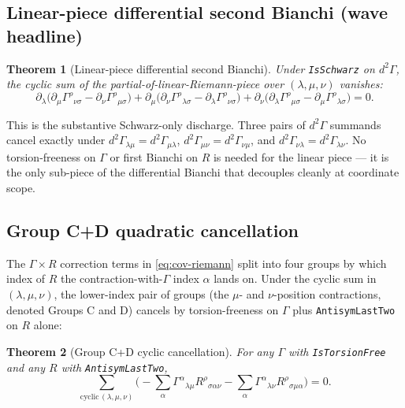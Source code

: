 \documentclass[twocolumn]{revtex4-2}
\newtheorem{theorem}{Theorem}
\newcommand{\Christoffel}{\Gamma}
\begin{document}
\subsection{Linear-piece differential second Bianchi (wave headline)}
\label{sec:linear-diffbianchi}

\begin{theorem}[Linear-piece differential second Bianchi]
\label{thm:linear-diff-bianchi}
Under \texttt{IsSchwarz} on $d^{2}\Christoffel$, the cyclic sum of
the partial-of-linear-Riemann-piece over $(\lambda,\mu,\nu)$ vanishes:
\begin{equation}
\partial_{\lambda} \big(\partial_{\mu} \Christoffel^{\rho}{}_{\nu\sigma}
                       - \partial_{\nu} \Christoffel^{\rho}{}_{\mu\sigma}\big)
+ \partial_{\mu} \big(\partial_{\nu} \Christoffel^{\rho}{}_{\lambda\sigma}
                       - \partial_{\lambda} \Christoffel^{\rho}{}_{\nu\sigma}\big)
+ \partial_{\nu} \big(\partial_{\lambda} \Christoffel^{\rho}{}_{\mu\sigma}
                       - \partial_{\mu} \Christoffel^{\rho}{}_{\lambda\sigma}\big)
= 0.
\label{eq:linear-diff-bianchi}
\end{equation}
\end{theorem}

This is the substantive Schwarz-only discharge. Three pairs of
$d^{2}\Christoffel$ summands cancel exactly under
$d^{2}\Christoffel_{\lambda\mu} = d^{2}\Christoffel_{\mu\lambda}$,
$d^{2}\Christoffel_{\mu\nu} = d^{2}\Christoffel_{\nu\mu}$, and
$d^{2}\Christoffel_{\nu\lambda} = d^{2}\Christoffel_{\lambda\nu}$. No
torsion-freeness on $\Christoffel$ or first Bianchi on $R$ is
needed for the linear piece — it is the only sub-piece of the
differential Bianchi that decouples cleanly at coordinate scope.

\subsection{Group C+D quadratic cancellation}
\label{sec:groupcd}
The $\Christoffel \times R$ correction terms in
\eqref{eq:cov-riemann} split into four groups by which index of $R$
the contraction-with-$\Christoffel$ index $\alpha$ lands on. Under
the cyclic sum in $(\lambda, \mu, \nu)$, the lower-index pair of
groups (the $\mu$- and $\nu$-position contractions, denoted Groups C
and D) cancels by torsion-freeness on $\Christoffel$ plus
\texttt{AntisymLastTwo} on $R$ alone:

\begin{theorem}[Group C+D cyclic cancellation]
\label{thm:group-cd}
For any $\Christoffel$ with \texttt{IsTorsionFree} and any $R$ with
\texttt{AntisymLastTwo},
\begin{equation}
\sum_{\mathrm{cyclic}\,(\lambda,\mu,\nu)}
  \Big(- \sum_{\alpha} \Christoffel^{\alpha}{}_{\lambda\mu}
        R^{\rho}{}_{\sigma\alpha\nu}
       - \sum_{\alpha} \Christoffel^{\alpha}{}_{\lambda\nu}
        R^{\rho}{}_{\sigma\mu\alpha}\Big) = 0.
\label{eq:group-cd}
\end{equation}
\end{theorem}
\end{document}
